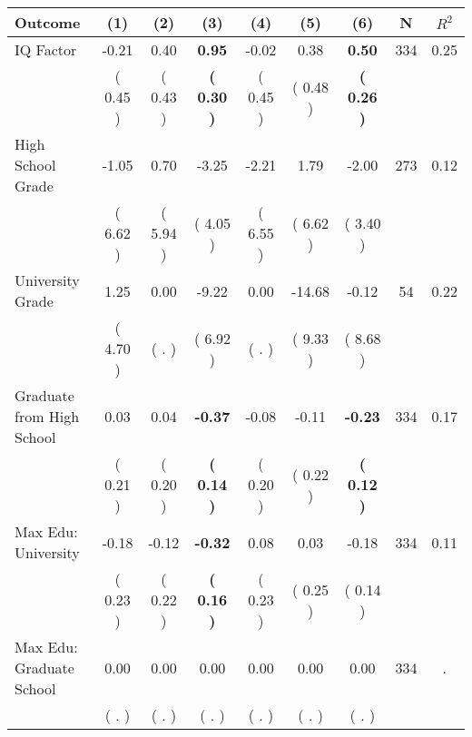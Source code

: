 \begin{tabular}{lcccccccc}
\toprule
 \textbf{Outcome} & \textbf{(1)} & \textbf{(2)} & \textbf{(3)} & \textbf{(4)} & \textbf{(5)} & \textbf{(6)} & \textbf{N} & \textbf{$ R^2$} \\
\midrule
IQ Factor &     -0.21 &      0.40 & \textbf{     0.95} &     -0.02 &      0.38 & \textbf{     0.50} & 334 &       0.25 \\ 
 & (     0.45 ) & (     0.43 ) & \textbf{(     0.30 )} & (     0.45 ) & (     0.48 ) & \textbf{(     0.26 )} & \\
High School Grade &     -1.05 &      0.70 &     -3.25 &     -2.21 &      1.79 &     -2.00 & 273 &       0.12 \\ 
 & (     6.62 ) & (     5.94 ) & (     4.05 ) & (     6.55 ) & (     6.62 ) & (     3.40 ) & \\
University Grade &      1.25 &      0.00 &     -9.22 &      0.00 &    -14.68 &     -0.12 & 54 &       0.22 \\ 
 & (     4.70 ) & (        . ) & (     6.92 ) & (        . ) & (     9.33 ) & (     8.68 ) & \\
Graduate from High School &      0.03 &      0.04 & \textbf{    -0.37} &     -0.08 &     -0.11 & \textbf{    -0.23} & 334 &       0.17 \\ 
 & (     0.21 ) & (     0.20 ) & \textbf{(     0.14 )} & (     0.20 ) & (     0.22 ) & \textbf{(     0.12 )} & \\
Max Edu: University &     -0.18 &     -0.12 & \textbf{    -0.32} &      0.08 &      0.03 &     -0.18 & 334 &       0.11 \\ 
 & (     0.23 ) & (     0.22 ) & \textbf{(     0.16 )} & (     0.23 ) & (     0.25 ) & (     0.14 ) & \\
Max Edu: Graduate School &      0.00 &      0.00 &      0.00 &      0.00 &      0.00 &      0.00 & 334 &          . \\ 
 & (        . ) & (        . ) & (        . ) & (        . ) & (        . ) & (        . ) & \\
\bottomrule
\end{tabular}
